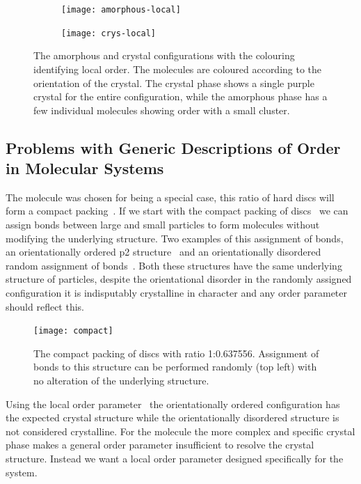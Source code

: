 \begin{figure}
    \begin{subfigure}{0.5\textwidth}
        \texttt{[image: amorphous-local]}
        \caption{}
        \label{fig:amorphous radial}
    \end{subfigure}
    \begin{subfigure}{0.5\textwidth}
        \texttt{[image: crys-local]}
        \caption{}
        \label{fig:crys radial}
    \end{subfigure}
    \caption{The amorphous  and crystal  configurations with the colouring identifying local order. The molecules are coloured according to the orientation of the crystal. The crystal phase shows a single purple crystal for the entire configuration, while the amorphous phase has a few individual molecules showing order with a small cluster.}
    \label{fig:frame comp}
\end{figure}

\subsection{Problems with Generic Descriptions of Order in Molecular Systems}

The \dcon molecule was chosen for being a special case, this ratio of hard discs will form a compact packing~. If we start with the compact packing of discs~ we can assign bonds between large and small particles to form molecules without modifying the underlying structure. Two examples of this assignment of bonds, an orientationally ordered p2 structure~ and an orientationally disordered random assignment of bonds~. Both these structures have the same underlying structure of particles, despite the orientational disorder in the randomly assigned configuration it is indisputably crystalline in character and any order parameter should reflect this.

\begin{figure}
    \centering
    \texttt{[image: compact]}
    \caption{The compact packing of discs with ratio 1:0.637556. Assignment of bonds to this structure can be performed randomly (top left) with no alteration of the underlying structure.}
    \label{fig:compact}
\end{figure}

Using the local order parameter~ the orientationally ordered configuration has the expected crystal structure while the orientationally disordered structure is not considered crystalline. For the \dcon molecule the more complex and specific crystal phase makes a general order parameter insufficient to resolve the crystal structure. Instead we want a local order parameter designed specifically for the \dcon system.

